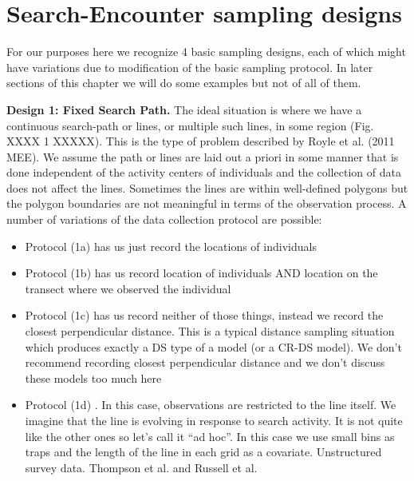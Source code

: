 \section{Search-Encounter sampling designs}

For our purposes here we recognize 4 basic sampling designs, each of
which might have variations due to modification of the basic sampling
protocol. In later sections of this chapter we will do some examples
but not of all of them.

{\flushleft \bf Design 1: Fixed Search Path.}  The ideal situation is
where we have a continuous search-path or lines, or multiple such
lines, in some region (Fig. XXXX 1 XXXXX). This is the type of problem described
by Royle et al. (2011 MEE). We assume the path or lines are laid out a
priori in some manner that is done independent of the activity centers
of individuals and the collection of data does not affect the
lines. Sometimes the lines are within well-defined polygons but the
polygon boundaries are not meaningful in terms of the observation
process.  A number of variations of the data collection protocol are
possible:
\begin{itemize}
 \item[] Protocol (1a) has us just record the locations of individuals
 \item[] Protocol (1b) has us record location of individuals AND
   location on the transect where we observed the individual
 \item[] Protocol (1c) has us record neither of those things, instead
   we record the closest perpendicular distance. This is a typical
   distance sampling situation which produces exactly a DS type of a
   model (or a CR-DS model). We don't recommend recording closest
   perpendicular distance and we don't discuss these models too much
   here
 \item[] Protocol (1d) . In this case, observations are restricted to
   the line itself. We imagine that the line is evolving in response
   to search activity. It is not quite like the other ones so let's
   call it ``ad hoc''. In this case we use small bins as traps and the
   length of the line in each grid as a covariate. Unstructured survey
   data. Thompson et al. and Russell et al.
 \end{itemize}


